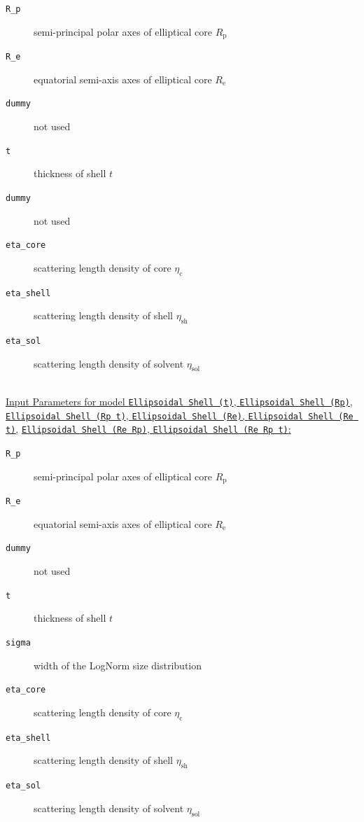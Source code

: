 \begin{description}
\item[\texttt{R\_p}] semi-principal polar axes of elliptical core $R_\mathrm{p}$
\item[\texttt{R\_e}] equatorial semi-axis axes of elliptical core $R_\mathrm{e}$
\item[\texttt{dummy}] not used
\item[\texttt{t}] thickness of shell $t$
\item[\texttt{dummy}] not used
\item[\texttt{eta\_core}] scattering length density of core $\eta_\text{c}$
\item[\texttt{eta\_shell}] scattering length density of shell $\eta_\text{sh}$
\item[\texttt{eta\_sol}] scattering length density of solvent $\eta_\text{sol}$
\end{description}
~\\
\underline{Input Parameters for model \texttt{Ellipsoidal Shell (t)}, \texttt{Ellipsoidal Shell (Rp)},}
\underline{\texttt{Ellipsoidal Shell (Rp t)}, \texttt{Ellipsoidal Shell (Re)}, \texttt{Ellipsoidal Shell (Re t)},}
\underline{\texttt{Ellipsoidal Shell (Re Rp)}, \texttt{Ellipsoidal Shell (Re Rp t)}:}
\begin{description}
\item[\texttt{R\_p}] semi-principal polar axes of elliptical core $R_\mathrm{p}$
\item[\texttt{R\_e}] equatorial semi-axis axes of elliptical core $R_\mathrm{e}$
\item[\texttt{dummy}] not used
\item[\texttt{t}] thickness of shell $t$
\item[\texttt{sigma}] width of the LogNorm size distribution
\item[\texttt{eta\_core}] scattering length density of core $\eta_\text{c}$
\item[\texttt{eta\_shell}] scattering length density of shell $\eta_\text{sh}$
\item[\texttt{eta\_sol}] scattering length density of solvent $\eta_\text{sol}$
\end{description}

